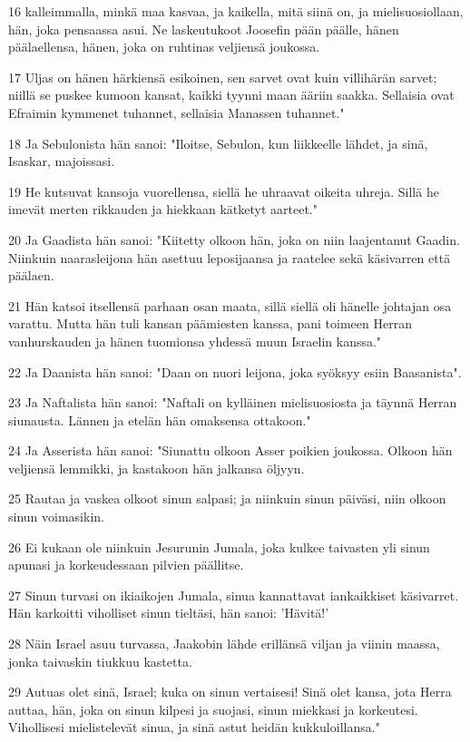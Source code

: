 \par 16 kalleimmalla, minkä maa kasvaa, ja kaikella, mitä siinä on, ja mielisuosiollaan, hän, joka pensaassa asui. Ne laskeutukoot Joosefin pään päälle, hänen päälaellensa, hänen, joka on ruhtinas veljiensä joukossa.
\par 17 Uljas on hänen härkiensä esikoinen, sen sarvet ovat kuin villihärän sarvet; niillä se puskee kumoon kansat, kaikki tyynni maan ääriin saakka. Sellaisia ovat Efraimin kymmenet tuhannet, sellaisia Manassen tuhannet."
\par 18 Ja Sebulonista hän sanoi: "Iloitse, Sebulon, kun liikkeelle lähdet, ja sinä, Isaskar, majoissasi.
\par 19 He kutsuvat kansoja vuorellensa, siellä he uhraavat oikeita uhreja. Sillä he imevät merten rikkauden ja hiekkaan kätketyt aarteet."
\par 20 Ja Gaadista hän sanoi: "Kiitetty olkoon hän, joka on niin laajentanut Gaadin. Niinkuin naarasleijona hän asettuu leposijaansa ja raatelee sekä käsivarren että päälaen.
\par 21 Hän katsoi itsellensä parhaan osan maata, sillä siellä oli hänelle johtajan osa varattu. Mutta hän tuli kansan päämiesten kanssa, pani toimeen Herran vanhurskauden ja hänen tuomionsa yhdessä muun Israelin kanssa."
\par 22 Ja Daanista hän sanoi: "Daan on nuori leijona, joka syöksyy esiin Baasanista".
\par 23 Ja Naftalista hän sanoi: "Naftali on kylläinen mielisuosiosta ja täynnä Herran siunausta. Lännen ja etelän hän omaksensa ottakoon."
\par 24 Ja Asserista hän sanoi: "Siunattu olkoon Asser poikien joukossa. Olkoon hän veljiensä lemmikki, ja kastakoon hän jalkansa öljyyn.
\par 25 Rautaa ja vaskea olkoot sinun salpasi; ja niinkuin sinun päiväsi, niin olkoon sinun voimasikin.
\par 26 Ei kukaan ole niinkuin Jesurunin Jumala, joka kulkee taivasten yli sinun apunasi ja korkeudessaan pilvien päällitse.
\par 27 Sinun turvasi on ikiaikojen Jumala, sinua kannattavat iankaikkiset käsivarret. Hän karkoitti viholliset sinun tieltäsi, hän sanoi: 'Hävitä!'
\par 28 Näin Israel asuu turvassa, Jaakobin lähde erillänsä viljan ja viinin maassa, jonka taivaskin tiukkuu kastetta.
\par 29 Autuas olet sinä, Israel; kuka on sinun vertaisesi! Sinä olet kansa, jota Herra auttaa, hän, joka on sinun kilpesi ja suojasi, sinun miekkasi ja korkeutesi. Vihollisesi mielistelevät sinua, ja sinä astut heidän kukkuloillansa."

